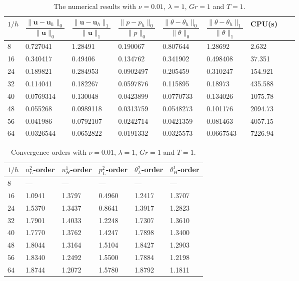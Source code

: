 \documentclass[10pt]{article}
\begin{document}
\begin{table}[htbp]
	\centering
	\caption{The numerical results with $\nu=0.01$, $\lambda=1$, $Gr=1$ and $T=1$.} \label{T3}
	\begin{tabular}{lllllllll}
		\toprule
		$1/h$ & $\dfrac{\| \boldsymbol{u} - \boldsymbol{u}_h \|_0}{\| \boldsymbol{u} \|_0}$ & $\dfrac{\| \boldsymbol{u} - \boldsymbol{u}_h \|_1}{\| \boldsymbol{u} \|_1}$ & $\dfrac{\| p - p_h \|_0}{\| p \|_0}$ & $\dfrac{\| \theta - \theta_h \|_0}{\| \theta \|_0}$ & $\dfrac{\| \theta - \theta_h \|_1}{\| \theta \|_1}$ &  CPU(s) \\
		\midrule
	8 & 0.727041 & 1.28491 & 0.190067 & 0.807644 & 1.28692 & 2.632 \\
	16 & 0.340417 & 0.49406 & 0.134762 & 0.341902 & 0.498408 & 37.351 \\
	24 & 0.189821 & 0.284953 & 0.0902497 & 0.205459 & 0.310247 & 154.921 \\
	32 & 0.114041 & 0.182267 & 0.0597876 & 0.115895 & 0.18973 & 435.588 \\
	40 & 0.0769314 & 0.130048 & 0.0423899 & 0.0770733 & 0.134026 & 1075.78 \\
	48 & 0.055268 & 0.0989118 & 0.0313759 & 0.0548273 & 0.101176 & 2094.73 \\
	56 & 0.041986 & 0.0792107 & 0.0242714 & 0.0421359 & 0.081463 & 4057.15 \\
	64 & 0.0326544 & 0.0652822 & 0.0191332 & 0.0325573 & 0.0667543 & 7226.94 \\
\hline
		\bottomrule
	\end{tabular}
	\label{tab:nu0}
\end{table}

\begin{table}[htbp]
	\centering
	\caption{Convergence orders with $\nu=0.01$, $\lambda=1$, $Gr=1$ and $T=1$.}
	\label{T4}
	\begin{tabular*}{0.66\textwidth}{llllll
		}
		\toprule
		$1/h$ & $u_L^2$-order & $u_H^1$-order & $p_L^2$-order &  $\theta_L^2$-order & $\theta_H^1$-order \\
		\midrule
		8   &--- & ---   &---   & ---  & ---  \\
		$16$ & 1.0941 & 1.3797 & 0.4960 & 1.2417 & 1.3707 \\
		$24$ & 1.5370 & 1.3437 & 0.8641 & 1.3917 & 1.2823 \\
		$32$ & 1.7901 & 1.4033 & 1.2248 & 1.7307 & 1.3610 \\
		$40$ & 1.7770 & 1.3762 & 1.4247 & 1.7898 & 1.3400 \\
		$48$ & 1.8044 & 1.3164 & 1.5104 & 1.8427 & 1.2903 \\
		$56$ & 1.8340 & 1.2492 & 1.5500 & 1.7884 & 1.2198 \\
		$64$ & 1.8744 & 1.2072 & 1.5780 & 1.8792 & 1.1811 \\
		\bottomrule
	\end{tabular*}
\end{table}
\end{document}

